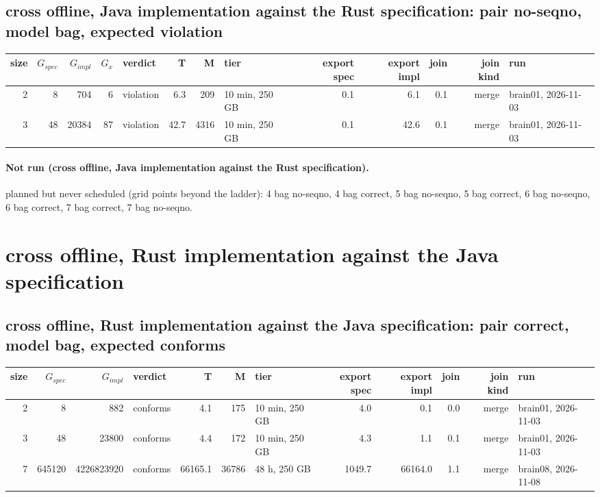 \documentclass[10pt]{article}
\begin{document}
\subsection*{cross offline, Java implementation against the Rust specification: pair \textsf{no-seqno}, model bag, expected violation}
\begin{longtable}{@{}rrrrlrrlrrrrl@{}}
\toprule
size & $G_{\mathit{spec}}$ & $G_{\mathit{impl}}$ & $G_x$ & verdict & T & M & tier & export spec & export impl & join & join kind & run \\
\midrule
\endhead
\color{blue} 2 & 8 & 704 & 6 & violation & 6.3 & 209 & 10 min, 250 GB & 0.1 & 6.1 & 0.1 & merge & brain01, 2026-11-03 \\
\color{blue} 3 & 48 & 20384 & 87 & violation & 42.7 & 4316 & 10 min, 250 GB & 0.1 & 42.6 & 0.1 & merge & brain01, 2026-11-03 \\
\bottomrule
\end{longtable}
\paragraph{Not run (cross offline, Java implementation against the Rust specification).}
planned but never scheduled (grid points beyond the ladder): 4 bag no-seqno, 4 bag correct, 5 bag no-seqno, 5 bag correct, 6 bag no-seqno, 6 bag correct, 7 bag correct, 7 bag no-seqno.\par
\section*{cross offline, Rust implementation against the Java specification}
\subsection*{cross offline, Rust implementation against the Java specification: pair \textsf{correct}, model bag, expected conforms}
\begin{longtable}{@{}rrrlrrlrrrrl@{}}
\toprule
size & $G_{\mathit{spec}}$ & $G_{\mathit{impl}}$ & verdict & T & M & tier & export spec & export impl & join & join kind & run \\
\midrule
\endhead
\color{blue} 2 & 8 & 882 & conforms & 4.1 & 175 & 10 min, 250 GB & 4.0 & 0.1 & 0.0 & merge & brain01, 2026-11-03 \\
\color{blue} 3 & 48 & 23800 & conforms & 4.4 & 172 & 10 min, 250 GB & 4.3 & 1.1 & 0.1 & merge & brain01, 2026-11-03 \\
\color{red} 7 & 645120 & 4226823920 & conforms & 66165.1 & 36786 & 48 h, 250 GB & 1049.7 & 66164.0 & 1.1 & merge & brain08, 2026-11-08 \\
\bottomrule
\end{longtable}
\end{document}
